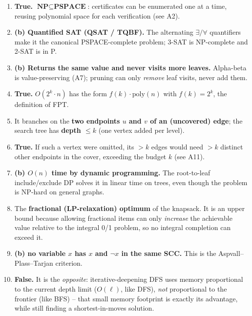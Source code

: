 \documentclass[11pt]{article}
\begin{document}
\begin{enumerate}[label=\textbf{B\arabic*.}, leftmargin=2.2em]

\item \textbf{True.} $\textbf{NP} \subseteq \textbf{PSPACE}$: certificates can
be enumerated one at a time, reusing polynomial space for each verification
(see A2).

\item \textbf{(b) Quantified SAT (QSAT / TQBF).} The alternating
$\exists/\forall$ quantifiers make it the canonical PSPACE-complete problem;
3-SAT is NP-complete and 2-SAT is in P.

\item \textbf{(b) Returns the same value and never visits more leaves.}
Alpha-beta is value-preserving (A7); pruning can only \emph{remove} leaf
visits, never add them.

\item \textbf{True.} $O(2^k \cdot n)$ has the form $f(k)\cdot\mathrm{poly}(n)$
with $f(k)=2^k$, the definition of FPT.

\item It branches on the \textbf{two endpoints $u$ and $v$ of an (uncovered)
edge}; the search tree has \textbf{depth $\le k$} (one vertex added per level).

\item \textbf{True.} If such a vertex were omitted, its $>k$ edges would need
$>k$ distinct other endpoints in the cover, exceeding the budget $k$ (see A11).

\item \textbf{(b) $O(n)$ time by dynamic programming.} The root-to-leaf
include/exclude DP solves it in linear time on trees, even though the problem is
NP-hard on general graphs.

\item The \textbf{fractional (LP-relaxation) optimum} of the knapsack. It is an
upper bound because allowing fractional items can only \emph{increase} the
achievable value relative to the integral 0/1 problem, so no integral
completion can exceed it.

\item \textbf{(b) no variable $x$ has $x$ and $\lnot x$ in the same SCC.} This
is the Aspvall--Plass--Tarjan criterion.

\item \textbf{False.} It is the \emph{opposite}: iterative-deepening DFS uses
memory proportional to the current depth limit ($O(\ell)$, like DFS), \emph{not}
proportional to the frontier (like BFS) -- that small memory footprint is
exactly its advantage, while still finding a shortest-in-moves solution.

\end{enumerate}
\end{document}
